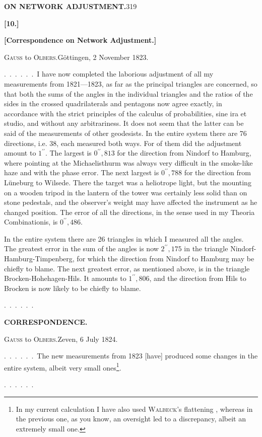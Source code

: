\noindent\textbf{ON NETWORK ADJUSTMENT.}\hfill319
\begin{center}\textbf{[10.]}\par\medskip
\textbf{[Correspondence on Network Adjustment.]}\end{center}

\begin{center}\textsc{Gauss} to \textsc{Olbers}.\quad Göttingen, 2 November 1823.\end{center}

.\ .\ .\ .\ .\ .\ I have now completed the laborious adjustment of all my
measurements from 1821---1823, as far as the principal triangles are concerned,
so that both the sums of the angles in the individual triangles and the ratios of
the sides in the crossed quadrilaterals and pentagons now agree exactly, in
accordance with the strict principles of the calculus of probabilities, sine
ira et studio, and without any arbitrariness. It does not seem that the latter
can be said of the measurements of other geodesists. In the entire system
there are 76 directions, i.e. 38, each measured both ways. For 
of them did the adjustment amount to $1^{\prime\prime}$. The largest is
$0^{\prime\prime}{,}813$ for the direction from Nindorf to Hamburg, where
pointing at the Michaelisthurm was always very difficult in the smoke-like haze
and with the phase error. The next largest is $0^{\prime\prime}{,}788$ for the
direction from Lüneburg to Wilsede. There the target was a heliotrope light,
but the mounting on a wooden tripod in the lantern of the tower was certainly
less solid than on stone pedestals, and the observer's weight may have affected
the instrument as he changed position. The  error of all the
directions, in the sense used in my Theoria Combinationis, is $0^{\prime\prime}{,}486$.

In the entire system there are 26 triangles in which I measured all
the angles. The greatest error in the sum of the angles is now $2^{\prime\prime}{,}175$
in the triangle Nindorf-Hamburg-Timpenberg, for which the direction from
Nindorf to Hamburg may be chiefly to blame. The next greatest error, as
mentioned above, is in the triangle Brocken-Hohehagen-Hils. It amounts
to $1^{\prime\prime}{,}806$, and the direction from Hils to Brocken is now
likely to be chiefly to blame.
\par\medskip
.\ .\ .\ .\ .\ .

\clearpage
{}\hfill\textbf{CORRESPONDENCE.}
\begin{center}\textsc{Gauss} to \textsc{Olbers}.\quad Zeven, 6 July 1824.\end{center}

\begingroup
\makeatletter
\renewcommand{\@makefnmark}{\hbox{\normalfont\textsuperscript{*})}}
\makeatother
.\ .\ .\ .\ .\ .\ The new measurements from 1823 [have] produced some
changes in the entire system, albeit very small ones\footnote{In my current calculation I have also used \textsc{Walbeck}'s flattening , whereas in the previous one, as you know, an oversight led to a discrepancy, albeit an extremely small one.}.
\par\medskip
.\ .\ .\ .\ .\ .
\endgroup
